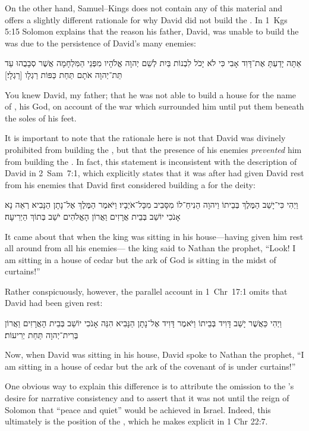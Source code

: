 On the other hand, Samuel--Kings does not contain any of this material and offers a slightly different rationale for why David did not build the \temple. In 1~Kgs 5:15 Solomon explains that the reason his father, David, was unable to build the \temple was due to the persistence of David's many enemies:
\begin{hebrewtext}
    אַתָּה יָדַעְתָּ אֶת־דָּוִד אָבִי כִּי לֹא יָכֹל לִבְנוֹת בַּיִת לְשֵׁם יְהוָה אֱלֹהָיו מִפְּנֵי הַמִּלְחָמָה אֲשֶׁר סְבָבֻהוּ עַד תֵּת־יְהוָה אֹתָם תַּחַת כַּפּוֹת רַגְלָו [רַגְלָי׃] 
\end{hebrewtext}
\begin{translation}
    You knew David, my father; that he was not able to build a house for the name of \yahweh, his God, on account of the war which surrounded him until \yahweh put them beneath the soles of his feet.
\end{translation}
\noindent
It is important to note that the rationale here is not that David was divinely prohibited from building the \temple, but that the presence of his enemies \emph{prevented} him from building the \temple. In fact, this statement is inconsistent with the description of David in 2~Sam~7:1, which explicitly states that it was after \yahweh had given David rest from his enemies that David first considered building a \temple for the deity:
    \begin{hebrewtext}
        וַיְהִי כִּי־יָשַׁב הַמֶּלֶךְ בְּבֵיתוֹ וַיהוָה הֵנִיחַ־לוֹ מִסָּבִיב מִכָּל־אֹיְבָיו׃
        וַיֹּאמֶר הַמֶּלֶךְ אֶל־נָתָן הַנָּבִיא רְאֵה נָא אָנֹכִי יוֹשֵׁב בְּבֵית אֲרָזִים וַאֲרוֹן הָאֱלֹהִים יֹשֵׁב בְּתוֹךְ הַיְרִיעָה׃
    \end{hebrewtext}
    \begin{translation}
        It came about that when the king was sitting in his house---\yahweh having given him rest all around from all his enemies---
        the king said to Nathan the prophet, ``Look! I am sitting in a house of cedar but the ark of God is sitting in the midst of curtains!''
    \end{translation}
\noindent
Rather conspicuously, however, the parallel account in 1~Chr~17:1 omits that David had been given rest:
\begin{hebrewtext}
    וַיְהִי כַּאֲשֶׁר יָשַׁב דָּוִיד בְּבֵיתוֹ וַיֹּאמֶר דָּוִיד אֶל־נָתָן הַנָּבִיא הִנֵּה אָנֹכִי יוֹשֵׁב בְּבֵית הָאֲרָזִים וַאֲרוֹן בְּרִית־יְהוָה תַּחַת יְרִיעוֹת׃
\end{hebrewtext}
\begin{translation}
    Now, when David was sitting in his house, David spoke to Nathan the prophet, ``I am sitting in a house of cedar but the ark of the covenant of \yahweh is under curtains!'' 
\end{translation}
\noindent
One obvious way to explain this difference is to attribute the omission to the \chronicler's desire for narrative consistency and to assert that it was not until the reign of Solomon that ``peace and quiet'' would be achieved in Israel. Indeed, this ultimately is the position of the \chronicler, which he makes explicit in 1 Chr 22:7. 


